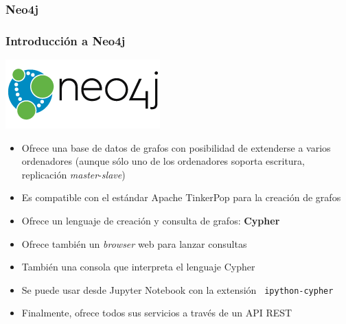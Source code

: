 \documentclass[14pt]{beamer}
\begin{document}
\subsubsection{Neo4j}

\begin{frame}[allowframebreaks]
  \frametitle{Introducción a Neo4j}
\centering\includegraphics[width=.4\textwidth]{img/neo4j-logo-2015}
  \begin{itemize}
\item Ofrece una base de datos de grafos con posibilidad de extenderse a
  varios ordenadores (aunque sólo uno de los ordenadores soporta escritura,
  replicación {\em master}-{\em slave})
\item Es compatible con el estándar Apache TinkerPop para la creación de
  grafos
\item Ofrece un lenguaje de creación y consulta de grafos: {\bf Cypher}
\item Ofrece también un {\em browser\/} web para lanzar consultas
\item También una consola que interpreta el lenguaje Cypher
\item Se puede usar desde Jupyter Notebook con la extensión {\tt
    ipython-cypher}
\item Finalmente, ofrece todos sus servicios a través de un API REST
  \end{itemize}
\end{frame}
\end{document}
